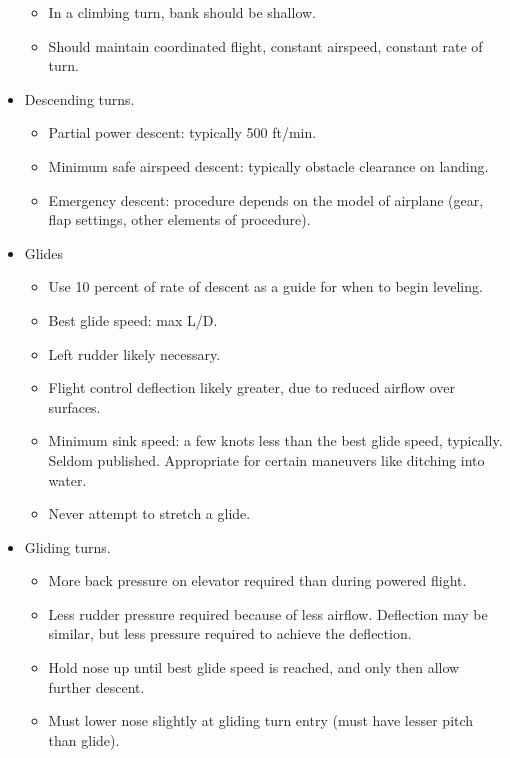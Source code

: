 \documentclass[letterpaper,10pt,titlepage]{article}
\begin{document}
\begin{itemize}
\begin{itemize}
	  \item In a climbing turn, bank should be shallow.
	  \item Should maintain coordinated flight, constant airspeed, constant rate of turn.
	  \end{itemize}
\item Descending turns.
	  \begin{itemize}
	  \item Partial power descent:  typically 500 ft/min.
	  \item Minimum safe airspeed descent:  typically obstacle clearance on landing.
	  \item Emergency descent:  procedure depends on the model of airplane (gear, flap settings, other elements of procedure).
	  \end{itemize}
\item Glides
	  \begin{itemize}
	  \item Use 10 percent of rate of descent as a guide for when to begin leveling.
	  \item Best glide speed:  max L/D.
	  \item Left rudder likely necessary.
	  \item Flight control deflection likely greater, due to reduced airflow over surfaces.
	  \item Minimum sink speed:  a few knots less than the best glide speed, typically.  Seldom published.
	        Appropriate for certain maneuvers like ditching into water.
	  \item Never attempt to stretch a glide.
	  \end{itemize}
\item Gliding turns.
	  \begin{itemize}
	  \item More back pressure on elevator required than during powered flight.
	  \item Less rudder pressure required because of less airflow.  Deflection may be similar, but less
	        pressure required to achieve the deflection.
	  \item Hold nose up until best glide speed is reached, and only then allow further descent.
	  \item Must lower nose slightly at gliding turn entry (must have lesser pitch than glide).
	  \end{itemize}
\end{itemize}


\end{document}
